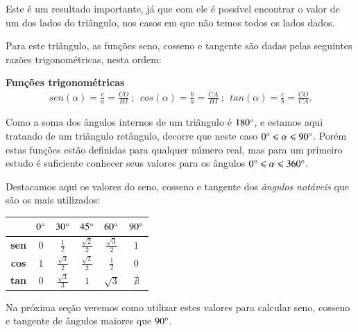  \vskip0.3cm

 Este é um resultado importante, já que com ele é possível encontrar o valor de um dos lados do triângulo, nos casos em que não temos todos os lados dados.

 Para este triângulo, as funções seno, cosseno e tangente são dadas pelas seguintes razões trigonométricas, nesta ordem:

 \vskip0.3cm

\colorbox{azul}{
 \begin{minipage}{0.9\linewidth}
 \begin{center}
 \textbf{Funções trigonométricas}
  \begin{eqnarray*}
   sen(\alpha)= \frac{c}{a}= \frac{CO}{HI} \ ; \ \ cos(\alpha)= \frac{b}{a}= \frac{CA}{HI} \ ; \ \ tan(\alpha)= \frac{c}{b}= \frac{CO}{CA}.
 \end{eqnarray*}
 \end{center}
 \end{minipage}}

 \vskip0.3cm

 Como a soma dos ângulos internos de um triângulo é $180 \degree$, e estamos aqui tratando de um triângulo retângulo, decorre que neste caso $0 \degree \leqslant \alpha \leqslant 90 \degree$. Porém estas funções estão definidas para qualquer número real, mas para um primeiro estudo é suficiente conhecer seus valores para os ângulos $0 \degree \leqslant \alpha \leqslant 360 \degree$.

 Destacamos aqui os valores do seno, cosseno e tangente dos \emph{ângulos notáveis} que são os mais utilizados:

 \begin{table}[H]
 \centering
 \begin{tabular}{|c|c|c|c|c|c|} \hline
 \rowcolor{cinza}
               & $0 \degree$  & $30 \degree$  & $45 \degree$  & $60 \degree$ & $90 \degree$  \\\hline
  \textbf{sen} & $0$ &$\frac{1}{2}$ & $\frac{\sqrt{2}}{2}$ & $\frac{\sqrt{3}}{2}$ & $1$ \\\hline
  \textbf{cos} & $1$ & $\frac{\sqrt{3}}{2}$ & $\frac{\sqrt{2}}{2}$ & $\frac{1}{2}$ & $0$ \\\hline
  \textbf{tan} & $0$ & $\frac{\sqrt{3}}{3}$ & $1$ & $\sqrt{3}$ & $\nexists$ \\\hline
 \end{tabular}
\end{table}
 Na próxima seção veremos como utilizar estes valores para calcular seno, cosseno e tangente de ângulos maiores que $90 \degree$.


